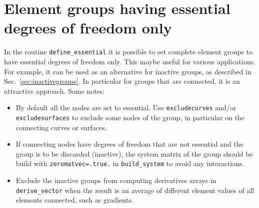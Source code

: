 \section{Element groups having essential degrees of freedom only}

In the routine \texttt{define\_essential} it is possible to set complete
element groups to have essential degrees of freedom only. This maybe useful for
various applications. For example, it can be used as an alternative for
inactive groups, as described in Sec.~\ref{sec:inactivegroups}. In
particular for groups that are connected, it is an attractive approach. Some
notes:
\begin{itemize}
   \item By default all the nodes are set to essential. Use
         \texttt{excludecurves} and/or \texttt{excludesurfaces} to exclude
         some nodes of the group, in particular on the connecting curves or
         surfaces.
   \item If connecting nodes have degrees of freedom that are not
         essential 
         and the group is to be discarded (inactive), the system
         matrix of the
         group should be build with \texttt{zeromatvec=.true.} in
         \texttt{build\_system} to avoid any interactions.
   \item Exclude the inactive groups from computing derivatives arrays
         in \texttt{derive\_vector} when the result is an average of different
         element values of all elements connected, such as gradients.
\end{itemize}
